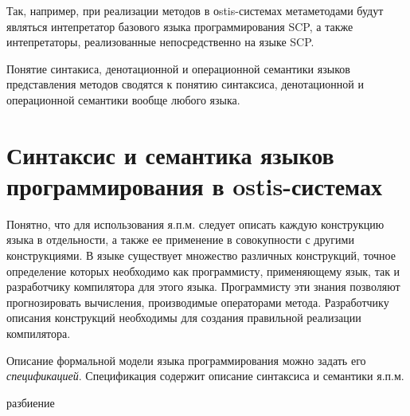 Так, например, при реализации методов в оstis-системах метаметодами будут являться интепретатор базового языка программирования SCP, а также интепретаторы, реализованные непосредственно на языке SCP. 

Понятие синтакиса, денотационной и операционной семантики языков представления методов сводятся к понятию синтаксиса, денотационной и операционной семантики вообще любого языка.

\section{Синтаксис и семантика языков программирования в ostis-системах}
\label{sec_programs_method_representation_language_syntax_and_semantic}

Понятно, что для использования я.п.м. следует описать каждую конструкцию языка в отдельности, а также ее применение в совокупности с другими конструкциями. В языке существует множество различных конструкций, точное определение которых необходимо как программисту, применяющему язык, так и разработчику компилятора для этого языка. Программисту эти знания позволяют прогнозировать вычисления, производимые операторами метода. Разработчику описания конструкций необходимы для создания правильной реализации компилятора.

Описание формальной модели языка программирования можно задать его \textit{спецификацией}. Спецификация содержит описание синтаксиса и семантики я.п.м.

\begin{SCn}
\begin{scnrelfromset}{разбиение}
    \begin{scnindent}
    \end{scnindent}
    \begin{scnindent}
    \end{scnindent}
    \begin{scnindent}
    \end{scnindent}
\end{scnrelfromset}
\end{SCn}

